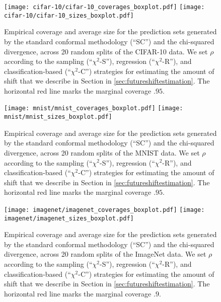 \begin{figure}[ht]
    \centering
    \texttt{[image: cifar-10/cifar-10\_coverages\_boxplot.pdf]}
    \hfill
    \texttt{[image: cifar-10/cifar-10\_sizes\_boxplot.pdf]}
    \caption{Empirical coverage and average size for the prediction sets
    generated by the standard conformal methodology (``SC'') and the chi-squared
    divergence, across 20 random splits of the CIFAR-10 data.  We set $\rho$
    according to the sampling (``$\chi^2$-S''), regression (``$\chi^2$-R''), and
    classification-based (``$\chi^2$-C'') strategies for estimating the amount
    of shift that we describe in Section in \ref{sec:futureshiftestimation}.
    The horizontal red line marks the marginal coverage $.95$.}
    \label{fig:cifar-10}
\end{figure}
\begin{figure}[ht]
    \centering
    \texttt{[image: mnist/mnist\_coverages\_boxplot.pdf]}
    \hfill
    \texttt{[image: mnist/mnist\_sizes\_boxplot.pdf]}
    \caption{Empirical coverage and average size for the prediction sets
    generated by the standard conformal methodology (``SC'') and the chi-squared
    divergence, across 20 random splits of the MNIST data.  We set $\rho$
    according to the sampling (``$\chi^2$-S''), regression (``$\chi^2$-R''), and
    classification-based (``$\chi^2$-C'') strategies for estimating the amount
    of shift that we describe in Section in \ref{sec:futureshiftestimation}. The
    horizontal red line marks the marginal coverage $.95$.}
    \label{fig:mnist}
\end{figure}
\begin{figure}[ht]
    \centering
    \texttt{[image: imagenet/imagenet\_coverages\_boxplot.pdf]}
    \hfill
    \texttt{[image: imagenet/imagenet\_sizes\_boxplot.pdf]}
    \caption{Empirical coverage and average size for the prediction sets
    generated by the standard conformal methodology (``SC'') and the chi-squared
    divergence, across 20 random splits of the ImageNet data.  We set $\rho$
    according to the sampling (``$\chi^2$-S''), regression (``$\chi^2$-R''), and
    classification-based (``$\chi^2$-C'') strategies for estimating the amount
    of shift that we describe in Section in \ref{sec:futureshiftestimation}. The
    horizontal red line marks the marginal coverage $.9$.}
    \label{fig:imagenet}
\end{figure}


